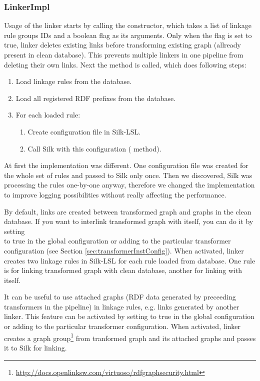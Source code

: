 \subsubsection{LinkerImpl}

Usage of the linker starts by calling the  constructor, which takes a list of linkage rule groups IDs and a boolean flag  as its arguments. Only when the flag is set to true, linker deletes existing links before transforming existing graph (allready present in clean database). This prevents multiple linkers in one pipeline from deleting their own links. Next the  method is called, which does following steps:

\begin{enumerate}
	\item Load linkage rules from the database.
	\item Load all registered RDF prefixes from the database.
	\item For each loaded rule:
	\begin{enumerate}
		\item Create configuration file in Silk-LSL.
		\item Call Silk with this configuration ( method).
	\end{enumerate}
\end{enumerate}

At first the implementation was different. One configuration file was created for the whole set of rules and passed to Silk only once. Then we discovered, Silk was processing the rules one-by-one anyway, therefore we changed the implementation to improve logging possibilities without really affecting the performance.

By default, links are created between transformed graph and graphs in the clean database. If you want to interlink transformed graph with itself, you can do it by setting \\ to true in the global configuration or adding  to the particular transformer configuration (see Section \ref{sec:transformerInstConfig}). When activated, linker creates two linkage rules in Silk-LSL for each rule loaded from database. One rule is for linking transformed graph with clean database, another for linking with itself.

It can be useful to use attached graphs (RDF data generated by preceeding transformers in the pipeline) in linkage rules, e.g. links generated by another linker. This feature can be activated by setting  to true in the global configuration or adding  to the particular transformer configuration. When activated, linker creates a graph group\footnote{\url{http://docs.openlinksw.com/virtuoso/rdfgraphsecurity.html}} from tranformed graph and its attached graphs and passes it to Silk for linking.

